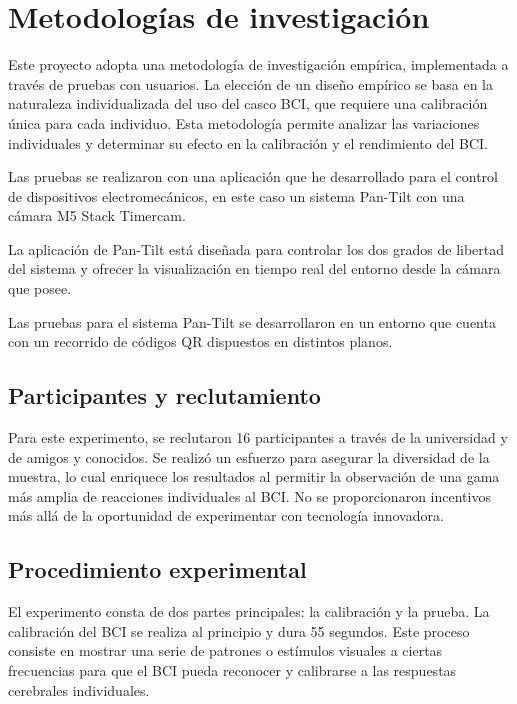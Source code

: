 \section{Metodologías de investigación}
\label{researchmethodology}

Este proyecto adopta una metodología de investigación empírica, implementada a través de pruebas con usuarios. La elección de un diseño empírico se basa en la naturaleza individualizada del uso del casco BCI, que requiere una calibración única para cada individuo. Esta metodología permite analizar las variaciones individuales y determinar su efecto en la calibración y el rendimiento del BCI.



Las pruebas se realizaron con una aplicación que he desarrollado para el control de dispositivos electromecánicos, en este caso un sistema Pan-Tilt con una cámara M5 Stack Timercam.



La aplicación de Pan-Tilt está diseñada para controlar los dos grados de libertad del sistema y ofrecer la visualización en tiempo real del entorno desde la cámara que posee.



Las pruebas para el sistema Pan-Tilt se desarrollaron en un entorno que cuenta con un recorrido de códigos QR dispuestos en distintos planos.



\subsection{Participantes y reclutamiento}

Para este experimento, se reclutaron 16 participantes a través de la universidad y de amigos y conocidos. Se realizó un esfuerzo para asegurar la diversidad de la muestra, lo cual enriquece los resultados al permitir la observación de una gama más amplia de reacciones individuales al BCI. No se proporcionaron incentivos más allá de la oportunidad de experimentar con tecnología innovadora.



\subsection{Procedimiento experimental}

El experimento consta de dos partes principales: la calibración y la prueba. La calibración del BCI se realiza al principio y dura 55 segundos. Este proceso consiste en mostrar una serie de patrones o estímulos visuales a ciertas frecuencias para que el BCI pueda reconocer y calibrarse a las respuestas cerebrales individuales.

